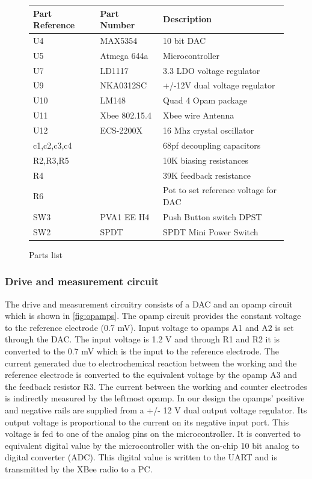 \begin{figure}
\begin{center}
\tiny
\begin{tabular}{l l l}
Part Reference & Part Number & Description \\
\hline
U4 & MAX5354 & 10 bit DAC \\
U5 & Atmega 644a &Microcontroller \\
U7 & LD1117 & 3.3 LDO voltage regulator \\
U9 & NKA0312SC & +/-12V dual voltage regulator \\
U10 & LM148 & Quad 4 Opam package \\
U11 & Xbee 802.15.4 & Xbee wire Antenna  \\
U12 & ECS-2200X & 16 Mhz crystal oscillator \\
c1,c2,c3,c4 & &68pf decoupling capacitors \\
R2,R3,R5 & & 10K biasing resistances \\
R4 & & 39K feedback resistance \\
R6 & & Pot to set reference voltage for DAC \\
SW3 & PVA1 EE H4  & Push Button switch DPST \\
SW2 & SPDT &  SPDT Mini Power Switch 
\end{tabular}
\normalsize
\end{center}
\caption{Parts list}
\label{fig:parts}
\end{figure}

\subsubsection{Drive and measurement circuit}
The drive and measurement circuitry consists of a DAC and an opamp circuit which is shown in \ref{fig:opamps}. The opamp circuit provides the constant voltage to the reference electrode (0.7 mV).   Input voltage to opamps A1 and A2 is set through the DAC. The input voltage is 1.2 V and through R1 and R2 it is converted to the 0.7 mV which is the input to the reference electrode. The current generated due to electrochemical reaction between the working and the reference electrode is converted to the equivalent voltage by the opamp A3 and the feedback resistor R3. The current between the working and counter electrodes is indirectly measured by the leftmost opamp. In our design the opamps' positive and negative rails are supplied from a +/- 12 V dual output voltage regulator. Its output voltage is proportional to the current on its negative input port. This voltage is fed to one of the analog pins on the microcontroller. It is converted to equivalent digital value by the microcontroller with the on-chip 10 bit analog to digital converter (ADC). This digital value is written to the UART and is transmitted by the XBee radio to a PC.


